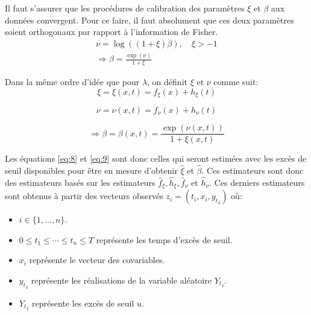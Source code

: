 \documentclass[aspectratio=169, 12pt, french]{beamer}
\begin{document}
\begin{frame}
Il faut s'assurer que les procédures de calibration des paramètres $\xi$ et $\beta$ aux données convergent. Pour ce faire, il faut absolument que ces deux paramètres soient orthogonaux par rapport à l'information de Fisher.
\begin{equation}
 \begin{split}
  \nu = \log((1+\xi)\beta), & \ \xi > -1 \\ 
  \Rightarrow \beta = \frac{\exp(\nu)}{1+\xi}
  \end{split}
  \end{equation}
\end{frame}

\begin{frame}
Dans la même ordre d'idée que pour $\lambda$, on définit $\xi$ et $\nu$ comme suit:
\begin{equation}\label{eq:8}
 \xi = \xi(x, t) = f_\xi(x) + h_\xi(t)
\end{equation}
  
 \begin{equation}\label{eq:9}
 \nu = \nu(x, t) = f_\nu(x) + h_\nu(t)
 \end{equation}
 
  \begin{equation}
  \Rightarrow \beta = \beta(x, t) =  \frac{\exp(\nu(x,t))}{1+\xi(x,t)}
 \end{equation}
\end{frame}

\begin{frame}
Les équations \ref{eq:8} et \ref{eq:9} sont donc celles qui seront estimées avec les excès de seuil disponibles pour être en mesure d'obtenir $\hat\xi$ et $\hat\beta$. Ces estimateurs sont donc des estimateurs basés sur les estimateurs $\hat{f}_\xi, \hat{h}_\xi, \hat{f}_\nu$ et $ \hat{h}_\nu$. Ces derniers estimateurs sont obtenus à partir des vecteurs observés $z_i = (t_i, x_i, {y_t}_{i})$ où:
\begin{itemize}
\item $i \in \{1, \dots, n\}$.
\item $0 \leq t_1 \le \cdots \le t_n \leq T$ représente les temps d'excès de seuil.
\item $x_i$ représente le vecteur des covariables.
\item ${y_t}_{i}$ représente les réalisations de la variable aléatoire ${Y_t}_{i}$.
\item ${Y_t}_{i}$ représente les excès de seuil $u$.
\end{itemize}
\end{frame}
\end{document}
